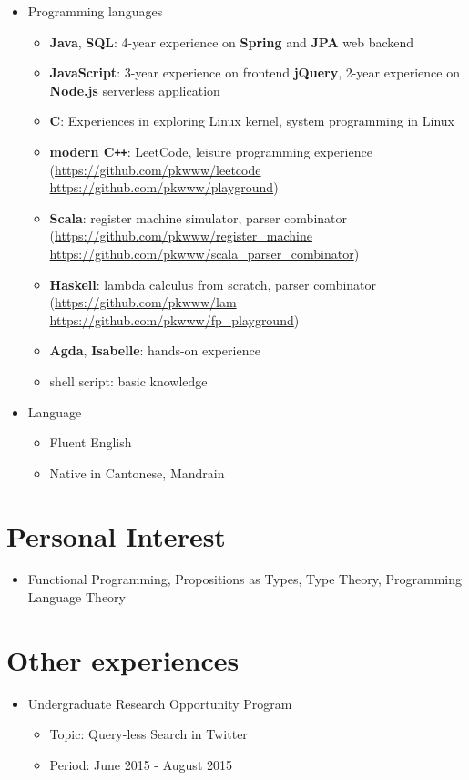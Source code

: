 \documentclass[a4paper,12pt]{article}
\begin{document}
\begin{itemize}
    \item Programming languages
    \begin{itemize}
      \item \textbf{Java}, \textbf{SQL}: 4-year experience on \textbf{Spring} and \textbf{JPA} web backend
      \item \textbf{JavaScript}: 3-year experience on frontend \textbf{jQuery}, 2-year experience on \textbf{Node.js} serverless application
      \item \textbf{C}: Experiences in exploring Linux kernel, system programming in Linux
      \item \textbf{modern C\texttt{++}}: LeetCode, leisure programming experience (\href{https://github.com/pkwww/leetcode}{https://github.com/pkwww/leetcode}\\
      \href{https://github.com/pkwww/playground}{https://github.com/pkwww/playground})
      \item \textbf{Scala}: register machine simulator, parser combinator (\href{https://github.com/pkwww/register_machine}{https://github.com/pkwww/register\_machine}\\ \href{https://github.com/pkwww/scala_parser_combinator}{https://github.com/pkwww/scala\_parser\_combinator})
      \item \textbf{Haskell}: lambda calculus from scratch,  parser combinator (\href{https://github.com/pkwww/lam}{https://github.com/pkwww/lam}\\ \href{https://github.com/pkwww/fp_playground}{https://github.com/pkwww/fp\_playground})
      \item \textbf{Agda}, \textbf{Isabelle}: hands-on experience
      \item shell script: basic knowledge
    \end{itemize}
  
    \item Language
    \begin{itemize}
      \item Fluent English
      \item Native in Cantonese, Mandrain
    \end{itemize}
  \end{itemize}

  \section*{Personal Interest}
  \begin{itemize}
    \item Functional Programming, Propositions as Types, Type Theory, Programming Language Theory
  \end{itemize}

  \section*{Other experiences}
  \begin{itemize}
    \item Undergraduate Research Opportunity Program
    \begin{itemize}
      \item Topic: Query-less Search in Twitter
      \item Period: June 2015 - August 2015
    \end{itemize}
  \end{itemize}
\end{document}
